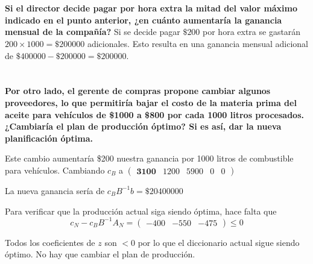 \documentclass[10pt,a4paper]{article}
\begin{document}
\section{} %
\textbf{Si el director decide pagar por hora extra la mitad del valor máximo indicado en el punto anterior, ¿en cuánto aumentaría la ganancia mensual de la compañía?}
Si se decide pagar $\$200$ por hora extra se gastarán $200 \times 1000 = \$200000$ adicionales. Esto resulta en una ganancia mensual adicional de $\$400000 - \$200000 = \$200000$.

\section{} %
\textbf{Por otro lado, el gerente de compras propone cambiar algunos proveedores, lo que permitiría bajar el costo de la materia prima del aceite para vehículos de \$1000 a \$800 por cada 1000 litros procesados. ¿Cambiaría el plan de producción óptimo? Si es así, dar la nueva planificación óptima.}

\vspace{5mm}

Este cambio aumentaría \$200 nuestra ganancia por 1000 litros de combustible para vehículos. Cambiando $c_B$ a $\begin{pmatrix} \textbf{3100} & 1200 & 5900 & 0 & 0\end{pmatrix}$

La nueva ganancia sería de $c_B B^{-1} b = \$20400000$

Para verificar que la producción actual siga siendo óptima, hace falta que
\[
	c_N - c_B B^{-1} A_N = \begin{pmatrix} -400 & -550 & -475 \end{pmatrix} \leq 0
\]

Todos los coeficientes de $z$ son $< 0$ por lo que el diccionario actual sigue siendo óptimo. No hay que cambiar el plan de producción.

\section{} %
\section{} %
\section{} %
\end{document}
